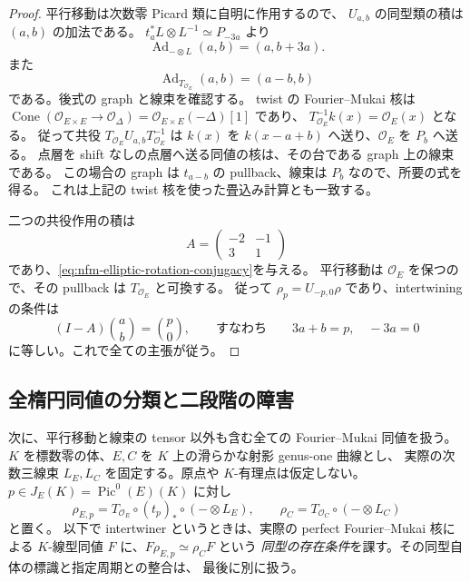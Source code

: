 \begin{proof}
平行移動は次数零 Picard 類に自明に作用するので、
$U_{a,b}$ の同型類の積は $(a,b)$ の加法である。
$t_a^*L\otimes L^{-1}\simeq P_{-3a}$ より
\[
 \operatorname{Ad}_{-\otimes L}(a,b)=(a,b+3a).
\]
また
\[
 \operatorname{Ad}_{T_{\mathcal O_E}}(a,b)=(a-b,b)
\]
である。後式の graph と線束を確認する。
twist の Fourier--Mukai 核は
$\operatorname{Cone}(\mathcal O_{E\times E}\to\mathcal O_\Delta)
=\mathcal O_{E\times E}(-\Delta)[1]$ であり、
$T_{\mathcal O_E}^{-1}k(x)=\mathcal O_E(x)$ となる。
従って共役 $T_{\mathcal O_E}U_{a,b}T_{\mathcal O_E}^{-1}$ は
$k(x)$ を $k(x-a+b)$ へ送り、$\mathcal O_E$ を $P_b$ へ送る。
点層を shift なしの点層へ送る同値の核は、その台である graph 上の線束である。
この場合の graph は $t_{a-b}$ の pullback、線束は $P_b$ なので、所要の式を得る。
これは上記の twist 核を使った畳込み計算とも一致する。

二つの共役作用の積は
\[
 A=\begin{pmatrix}-2&-1\\3&1\end{pmatrix}
\]
であり、\eqref{eq:nfm-elliptic-rotation-conjugacy}を与える。
平行移動は $\mathcal O_E$ を保つので、その pullback は
$T_{\mathcal O_E}$ と可換する。
従って $\rho_p=U_{-p,0}\rho$ であり、intertwining の条件は
\[
 (I-A)\binom ab=\binom p0,
 \qquad\text{すなわち}\qquad
 3a+b=p,\quad -3a=0
\]
に等しい。これで全ての主張が従う。
\end{proof}

\subsection{全楕円同値の分類と二段階の障害}

次に、平行移動と線束の tensor 以外も含む全ての Fourier--Mukai 同値を扱う。
$K$ を標数零の体、$E,C$ を $K$ 上の滑らかな射影 genus-one 曲線とし、
実際の次数三線束 $L_E,L_C$ を固定する。原点や $K$-有理点は仮定しない。
$p\in J_E(K)=\operatorname{Pic}^0(E)(K)$ に対し
\[
 \rho_{E,p}=T_{\mathcal O_E}\circ(t_p)_*\circ(-\otimes L_E),
 \qquad
 \rho_C=T_{\mathcal O_C}\circ(-\otimes L_C)
\]
と置く。
以下で intertwiner というときは、実際の perfect Fourier--Mukai 核による
$K$-線型同値 $F$ に、$F\rho_{E,p}\simeq\rho_CF$ という
\emph{同型の存在条件}を課す。その同型自体の標識と指定周期との整合は、
最後に別に扱う。

